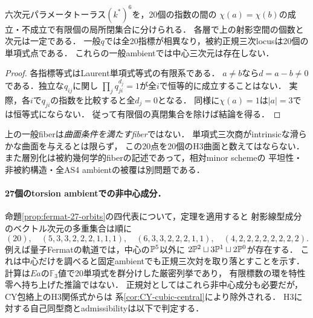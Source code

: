 \begin{corollary}[有限指標層別化と一般fiber]
\label{cor:skew-normal-strata}
六次元パラメータトーラス$(k^*)^6$を，20個の指数の間の
$\chi(a)=\chi(b)$の成立・不成立で有限個の局所閉集合に分けられる．
各層で上の射影空間の個数と次元は一定である．
一般$q$では全20指標が相異なり，被約正規三次locusは20個の単項式点である．
これらの一般ambientでは中心三次元は存在しない．
\end{corollary}
\begin{proof}
各指標等式はLaurent単項式等式の有限系である．
$a\ne b$なら$d=a-b\ne0$である．独立な$q_{ij}$に関し
$\prod_j q_{ji}^{d_j}=1$が全$i$で恒等的に成立することはない．
実際，各$i$で$q_{ji}$の指数を比較すると全$d_j=0$となる．
同様に$\chi(a)=1$は$|a|=3$では恒等式にならない．
従って有限個の真閉集合を除けば結論を得る．
\end{proof}

上の一般fiberは\emph{曲面条件を満たすfiber}ではない．
単項式三次商がintrinsicな滑らかな曲面を与えるとは限らず，
この20点を20個のH3曲面と数えてはならない．
また層別化は被約幾何学的fiberの記述であって，相対minor schemeの
平坦性・非被約構造・全AS4 ambientの被覆は別問題である．

\paragraph{27個のtorsion ambientでの非中心成分．}
命題\ref{prop:fermat-27-orbits}の四代表について，定理を適用すると
射影線型成分のベクトル次元の多重集合は順に
\[
 (20),\quad (5,3,3,2,2,2,1,1,1),\quad
 (6,3,3,2,2,2,1,1),\quad (4,2,2,2,2,2,2,2,2).
\]
例えば量子Fermatの軌道では，中心の$\mathbb P^5$以外に
$2\mathbb P^2\sqcup3\mathbb P^1\sqcup2\mathbb P^0$が存在する．
これは中心だけを調べると固定ambientでも正規三次対を取り落とすことを示す．
計算は$Ea$の$\mathbb F_3$値で20単項式を群分けした厳密列挙であり，
有限標数の環を特性零へ持ち上げた推論ではない．
正規対としてはこれら非中心成分も必要だが，CY包絡上のH3関係式からは
系\ref{cor:CY-cubic-central}により除外される．
H3に対する自己同型商とadmissibilityは以下で判定する．
